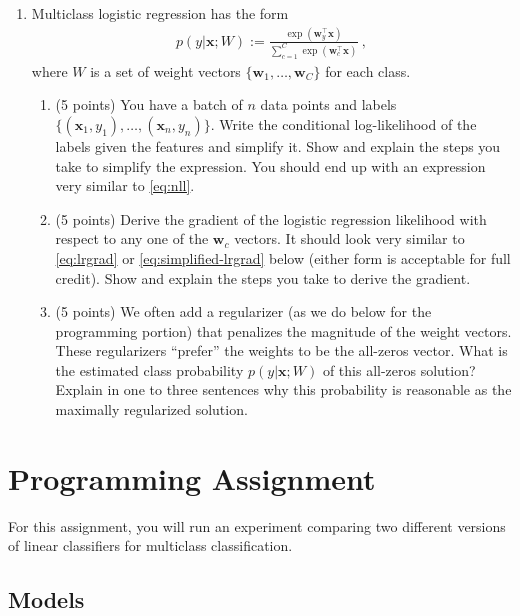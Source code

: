 \documentclass[10pt]{article}
\newcommand{\bx}{{\boldsymbol x}}
\newcommand{\bw}{{\boldsymbol w}}
\begin{document}
\begin{enumerate}

\item Multiclass logistic regression has the form
\begin{align}
p(y | \bx; W) := \frac{\exp(\bw_y^\top \bx)}{\sum_{c = 1}^C \exp(\bw_c^\top \bx)} ~,
\label{eq:mclogistic} 
\end{align}
where $W$ is a set of weight vectors $\{\bw_1, \ldots, \bw_C\}$ for each class. 

\begin{enumerate}

\item (5 points) You have a batch of $n$ data points and labels $\{(\bx_1, y_1), \ldots, (\bx_n, y_n)\}$. Write the conditional log-likelihood of the labels given the features and simplify it. Show and explain the steps you take to simplify the expression. You should end up with an expression very similar to \cref{eq:nll}.

\item (5 points) Derive the gradient of the logistic regression likelihood with respect to any one of the $\bw_c$ vectors. It should look very similar to \cref{eq:lrgrad} or \cref{eq:simplified-lrgrad} below (either form is acceptable for full credit). Show and explain the steps you take to derive the gradient.

\item (5 points) We often add a regularizer (as we do below for the programming portion) that penalizes the magnitude of the weight vectors. These regularizers ``prefer'' the weights to be the all-zeros vector. What is the estimated class probability $p(y | \bx; W)$ of this all-zeros solution? Explain in one to three sentences why this probability is reasonable as the maximally regularized solution.

\end{enumerate}

\end{enumerate}

\section*{Programming Assignment}

For this assignment, you will run an experiment comparing two different versions of linear classifiers for multiclass classification. 

\subsection*{Models}
\end{document}
